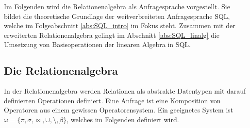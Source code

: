 Im Folgenden wird die Relationenalgebra als Anfragesprache vorgestellt. Sie bildet die theoretische Grundlage der weitverbreiteten Anfragesprache SQL, welche im Folgeabschnitt \ref{abs:SQL_intro} im Fokus steht. Zusammen mit der erweiterten Relationenalgebra gelingt im Abschnitt \ref{abs:SQL_linalg} die Umsetzung von Basisoperationen der linearen Algebra in SQL.

\subsection{Die Relationenalgebra}
\label{abs:rela_algebra}
In der Relationenalgebra werden Relationen als abstrakte Datentypen mit darauf definierten Operationen definiert. Eine Anfrage ist eine Komposition von Operatoren aus einem gewissen Operatorensystem. Ein geeignetes System ist $\omega= \{ \pi, \sigma, \bowtie, \cup, \setminus, \beta \}$, welches im Folgenden definiert wird.


